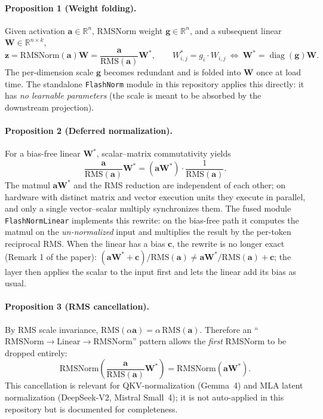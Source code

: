 \paragraph{Proposition 1 (Weight folding).}
Given activation $\mathbf{a}\in\mathbb{R}^{n}$, RMSNorm weight $\mathbf{g}\in\mathbb{R}^{n}$, and a subsequent linear $\mathbf{W}\in\mathbb{R}^{n\times k}$,
\[
\mathbf{z}=\mathrm{RMSNorm}(\mathbf{a})\mathbf{W}=\frac{\mathbf{a}}{\mathrm{RMS}(\mathbf{a})}\mathbf{W}^{*},\qquad
W^{*}_{i,j}=g_{i}\cdot W_{i,j}\ \Leftrightarrow\ \mathbf{W}^{*}=\operatorname{diag}(\mathbf{g})\mathbf{W}.
\]
The per-dimension scale $\mathbf{g}$ becomes redundant and is folded into $\mathbf{W}$ once at load time. The standalone \texttt{FlashNorm} module in this repository applies this directly: it has \emph{no learnable parameters} (the scale is meant to be absorbed by the downstream projection).

\paragraph{Proposition 2 (Deferred normalization).}
For a bias-free linear $\mathbf{W}^{*}$, scalar--matrix commutativity yields
\[
\frac{\mathbf{a}}{\mathrm{RMS}(\mathbf{a})}\mathbf{W}^{*}=\left(\mathbf{a}\mathbf{W}^{*}\right)\cdot\frac{1}{\mathrm{RMS}(\mathbf{a})}.
\]
The matmul $\mathbf{a}\mathbf{W}^{*}$ and the RMS reduction are independent of each other; on hardware with distinct matrix and vector execution units they execute in parallel, and only a single vector--scalar multiply synchronizes them. The fused module \texttt{FlashNormLinear} implements this rewrite: on the bias-free path it computes the matmul on the \emph{un-normalized} input and multiplies the result by the per-token reciprocal RMS. When the linear has a bias $\mathbf{c}$, the rewrite is no longer exact (Remark 1 of the paper): $\left(\mathbf{a}\mathbf{W}^{*}+\mathbf{c}\right)/\mathrm{RMS}(\mathbf{a})\neq\mathbf{a}\mathbf{W}^{*}/\mathrm{RMS}(\mathbf{a})+\mathbf{c}$; the layer then applies the scalar to the input first and lets the linear add its bias as usual.

\paragraph{Proposition 3 (RMS cancellation).}
By RMS scale invariance, $\mathrm{RMS}(\alpha\mathbf{a})=\alpha\,\mathrm{RMS}(\mathbf{a})$. Therefore an ``$\mathrm{RMSNorm}\to\mathrm{Linear}\to\mathrm{RMSNorm}$'' pattern allows the \emph{first} RMSNorm to be dropped entirely:
\[
\mathrm{RMSNorm}\!\left(\frac{\mathbf{a}}{\mathrm{RMS}(\mathbf{a})}\mathbf{W}^{*}\right)=\mathrm{RMSNorm}\!\left(\mathbf{a}\mathbf{W}^{*}\right).
\]
This cancellation is relevant for QKV-normalization (Gemma~4) and MLA latent normalization (DeepSeek-V2, Mistral Small~4); it is not auto-applied in this repository but is documented for completeness.

